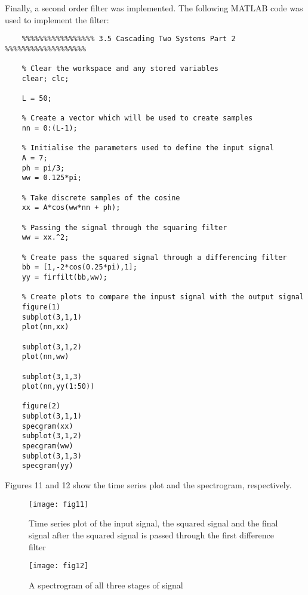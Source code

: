 \documentclass{article}
\begin{document}
Finally, a second order filter was implemented. The following MATLAB code was used to implement the filter:
\begin{lstlisting}
	%%%%%%%%%%%%%%%%% 3.5 Cascading Two Systems Part 2 %%%%%%%%%%%%%%%%%%%
	
	% Clear the workspace and any stored variables
	clear; clc;
	
	L = 50;
	
	% Create a vector which will be used to create samples
	nn = 0:(L-1);
	
	% Initialise the parameters used to define the input signal
	A = 7;
	ph = pi/3;
	ww = 0.125*pi;
	
	% Take discrete samples of the cosine
	xx = A*cos(ww*nn + ph);
	
	% Passing the signal through the squaring filter
	ww = xx.^2;
	
	% Create pass the squared signal through a differencing filter
	bb = [1,-2*cos(0.25*pi),1];
	yy = firfilt(bb,ww);
	
	% Create plots to compare the inpust signal with the output signal
	figure(1)
	subplot(3,1,1)
	plot(nn,xx)
	
	subplot(3,1,2)
	plot(nn,ww)
	
	subplot(3,1,3)
	plot(nn,yy(1:50))
	
	figure(2)
	subplot(3,1,1)
	specgram(xx)
	subplot(3,1,2)
	specgram(ww)
	subplot(3,1,3)
	specgram(yy)
\end{lstlisting}

Figures 11 and 12 show the time series plot and the spectrogram, respectively.

\begin{figure}[H]
	\centering
	\texttt{[image: fig11]}
	\caption{Time series plot of the input signal, the squared signal and the final signal after the squared signal is passed through the first difference filter}
\end{figure}

\begin{figure}[H]
	\centering
	\texttt{[image: fig12]}
	\caption{A spectrogram of all three stages of signal}
\end{figure}
\end{document}
